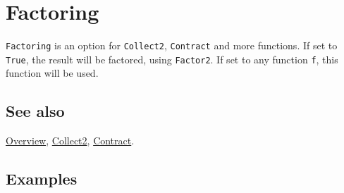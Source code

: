 \documentclass[../FeynCalcManual.tex]{subfiles}
\begin{document}
\begin{Shaded}
\begin{Highlighting}[]
 
\end{Highlighting}
\end{Shaded}

\hypertarget{factoring}{
\section{Factoring}\label{factoring}}

\texttt{Factoring} is an option for \texttt{Collect2}, \texttt{Contract}
and more functions. If set to \texttt{True}, the result will be
factored, using \texttt{Factor2}. If set to any function \texttt{f},
this function will be used.

\subsection{See also}

\hyperlink{toc}{Overview}, \hyperlink{collect2}{Collect2},
\hyperlink{contract}{Contract}.

\subsection{Examples}
\end{document}
